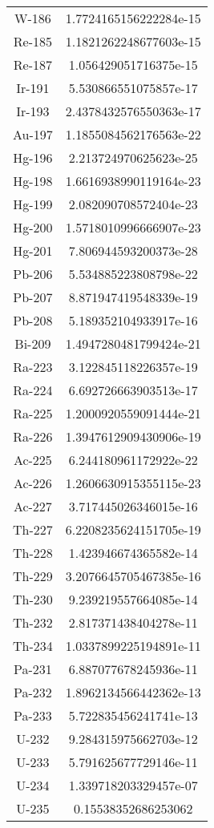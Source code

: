 \begin{table}[h!]
\begin{tabular}{|| c || c |}
W-186 &  1.7724165156222284e-15 \\
Re-185 &  1.1821262248677603e-15 \\
Re-187 &  1.056429051716375e-15 \\
Ir-191 &  5.530866551075857e-17 \\
Ir-193 &  2.4378432576550363e-17 \\
Au-197 &  1.1855084562176563e-22 \\
Hg-196 &  2.213724970625623e-25 \\
Hg-198 &  1.6616938990119164e-23 \\
Hg-199 &  2.082090708572404e-23 \\
Hg-200 &  1.5718010996666907e-23 \\
Hg-201 &  7.806944593200373e-28 \\
Pb-206 &  5.534885223808798e-22 \\
Pb-207 &  8.871947419548339e-19 \\
Pb-208 &  5.189352104933917e-16 \\
Bi-209 &  1.4947280481799424e-21 \\
Ra-223 &  3.122845118226357e-19 \\
Ra-224 &  6.692726663903513e-17 \\
Ra-225 &  1.2000920559091444e-21 \\
Ra-226 &  1.3947612909430906e-19 \\
Ac-225 &  6.244180961172922e-22 \\
Ac-226 &  1.2606630915355115e-23 \\
Ac-227 &  3.717445026346015e-16 \\
Th-227 &  6.2208235624151705e-19 \\
Th-228 &  1.423946674365582e-14 \\
Th-229 &  3.2076645705467385e-16 \\
Th-230 &  9.239219557664085e-14 \\
Th-232 &  2.817371438404278e-11 \\
Th-234 &  1.0337899225194891e-11 \\
Pa-231 &  6.887077678245936e-11 \\
Pa-232 &  1.8962134566442362e-13 \\
Pa-233 &  5.722835456241741e-13 \\
U-232 &  9.284315975662703e-12 \\
U-233 &  5.791625677729146e-11 \\
U-234 &  1.339718203329457e-07 \\
U-235 &  0.15538352686253062 \\

\end{tabular}
\end{table}
